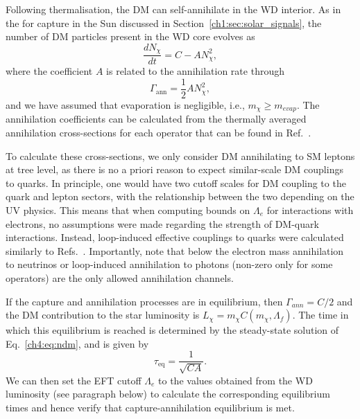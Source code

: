 Following thermalisation, the DM can self-annihilate in the WD interior. As in the for capture in the Sun discussed in Section~\ref{ch1:sec:solar_signals}, the number of DM particles present in the WD core evolves as
\begin{equation}
    \frac{dN_\chi}{dt} = C - A N_\chi^2, 
    \label{ch4:eq:ndm}
\end{equation}
where the coefficient $A$ is related to the annihilation rate through
\begin{equation}
 \Gamma_\mathrm{ann} =  \frac{1}{2}A N_\chi^2,   
\end{equation}
and we have assumed that evaporation is negligible, i.e., $m_\chi\geq m_{evap}$. 
The annihilation coefficients can be calculated from the thermally averaged annihilation cross-sections for each operator that can be found in Ref.~\cite{Zheng:2010js_Constraininginteractionstrength}.

To calculate these cross-sections, we only consider DM annihilating to SM leptons at tree level, as there is no a priori reason to expect similar-scale DM couplings to quarks. In principle, one would have two cutoff scales for DM coupling to the quark and lepton sectors, with the relationship between the two depending on the UV physics. 
This means that when computing bounds on $\Lambda_e$ for interactions with electrons, no assumptions were made regarding the strength of DM-quark interactions. 
Instead, loop-induced effective couplings to quarks were calculated similarly to Refs.~\cite{Kopp:2009et_DAMALIBRAleptonically,Bell:2019pyc_jun_CaptureLeptophilicDark}.  
Importantly, note that below the electron mass annihilation to neutrinos or loop-induced annihilation to photons (non-zero only for some operators) are the only allowed annihilation channels. 

If the capture and annihilation processes are in equilibrium, then $\Gamma_{ann}=C/2$ and the DM contribution to the star luminosity is $L_\chi=m_\chi C(m_\chi,\Lambda_f)$. The time in which this equilibrium is reached is determined by the steady-state solution of Eq.~\ref{ch4:eq:ndm}, and is given by
\begin{equation}
    \tau_\mathrm{eq} = \frac{1}{\sqrt{C A}}.\label{ch4:eq:taueq}
\end{equation}
We can then set the EFT cutoff $\Lambda_e$ to the values obtained from the WD luminosity (see paragraph below)  to calculate the corresponding equilibrium times and hence verify that capture-annihilation equilibrium is met. 


